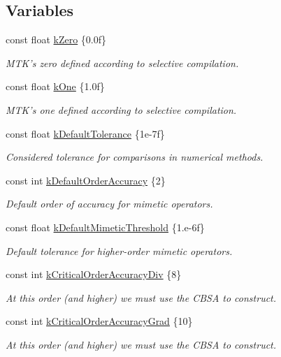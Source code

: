 \subsection*{Variables}
\begin{DoxyCompactItemize}
\item 
const float \hyperlink{group__c01-roots_ga59a451a5fae30d59649bcda274fea271}{k\-Zero} \{0.\-0f\}
\begin{DoxyCompactList}\small\item\em M\-T\-K's zero defined according to selective compilation. \end{DoxyCompactList}\item 
const float \hyperlink{group__c01-roots_ga26407c24d43b6b95480943340d285c71}{k\-One} \{1.\-0f\}
\begin{DoxyCompactList}\small\item\em M\-T\-K's one defined according to selective compilation. \end{DoxyCompactList}\item 
const float \hyperlink{group__c01-roots_gae914b125d81d1b97e0aee7bbc7739786}{k\-Default\-Tolerance} \{1e-\/7f\}
\begin{DoxyCompactList}\small\item\em Considered tolerance for comparisons in numerical methods. \end{DoxyCompactList}\item 
const int \hyperlink{group__c01-roots_ga0d95560098eb36420511103637b6952f}{k\-Default\-Order\-Accuracy} \{2\}
\begin{DoxyCompactList}\small\item\em Default order of accuracy for mimetic operators. \end{DoxyCompactList}\item 
const float \hyperlink{group__c01-roots_ga35718d949bdc81a08a9cc8ebbe3478a2}{k\-Default\-Mimetic\-Threshold} \{1.e-\/6f\}
\begin{DoxyCompactList}\small\item\em Default tolerance for higher-\/order mimetic operators. \end{DoxyCompactList}\item 
const int \hyperlink{group__c01-roots_ga0898eef2108473e44a5223932d571c31}{k\-Critical\-Order\-Accuracy\-Div} \{8\}
\begin{DoxyCompactList}\small\item\em At this order (and higher) we must use the C\-B\-S\-A to construct. \end{DoxyCompactList}\item 
const int \hyperlink{group__c01-roots_ga295dd2f403c775ecd942c22b5a777496}{k\-Critical\-Order\-Accuracy\-Grad} \{10\}
\begin{DoxyCompactList}\small\item\em At this order (and higher) we must use the C\-B\-S\-A to construct. \end{DoxyCompactList}\end{DoxyCompactItemize}


